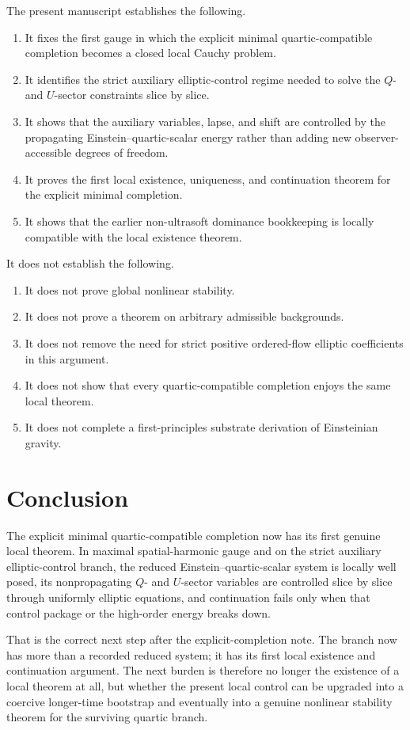 \documentclass[11pt]{article}
\begin{document}
The present manuscript establishes the following.
\begin{enumerate}
    \item It fixes the first gauge in which the explicit minimal quartic-compatible completion becomes a closed local Cauchy problem.
    \item It identifies the strict auxiliary elliptic-control regime needed to solve the \(Q\)- and \(U\)-sector constraints slice by slice.
    \item It shows that the auxiliary variables, lapse, and shift are controlled by the propagating Einstein--quartic-scalar energy rather than adding new observer-accessible degrees of freedom.
    \item It proves the first local existence, uniqueness, and continuation theorem for the explicit minimal completion.
    \item It shows that the earlier non-ultrasoft dominance bookkeeping is locally compatible with the local existence theorem.
\end{enumerate}

It does not establish the following.
\begin{enumerate}
    \item It does not prove global nonlinear stability.
    \item It does not prove a theorem on arbitrary admissible backgrounds.
    \item It does not remove the need for strict positive ordered-flow elliptic coefficients in this argument.
    \item It does not show that every quartic-compatible completion enjoys the same local theorem.
    \item It does not complete a first-principles substrate derivation of Einsteinian gravity.
\end{enumerate}

\section{Conclusion}

The explicit minimal quartic-compatible completion now has its first genuine local theorem. In maximal spatial-harmonic gauge and on the strict auxiliary elliptic-control branch, the reduced Einstein--quartic-scalar system is locally well posed, its nonpropagating \(Q\)- and \(U\)-sector variables are controlled slice by slice through uniformly elliptic equations, and continuation fails only when that control package or the high-order energy breaks down.

That is the correct next step after the explicit-completion note. The branch now has more than a recorded reduced system; it has its first local existence and continuation argument. The next burden is therefore no longer the existence of a local theorem at all, but whether the present local control can be upgraded into a coercive longer-time bootstrap and eventually into a genuine nonlinear stability theorem for the surviving quartic branch.
\end{document}
